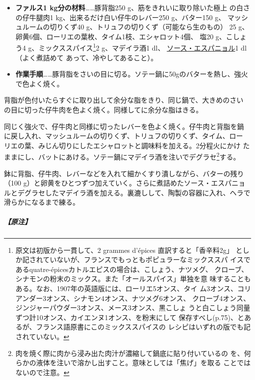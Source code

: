 \begin{recette}
\begin{itemize}
\item
  \textbf{ファルス1 kg分の材料}\ldots{}\ldots{}豚背脂250
  g、筋をきれいに取り除いた極上 の白さの仔牛腿肉1
  kg、出来るだけ白い仔牛のレバー250 g、バター150 g、
  マッシュルームの切りくず40 g、トリュフの切りくず（可能なら生のもの）
  25 g、卵黄6個、ローリエの葉\undemi{}枚、タイム1枝、エシャロット4個、
  塩20 g、こしょう4 g、ミックススパイス\footnote{原文は初版から一貫して、2
    grammes d'épices 直訳すると「香辛料2g」
    としか記されていないが、フランスでもっともポピュラーなミックススパ
    イスであるquatre-épicesカトルエピスの場合は、こしょう、ナツメグ、
    クローブ、シナモンの粉末のミックス。また「オールスパイス」単独を意
    味することもある。なお、1907年の英語版には、ローリエ5オンス、タイ
    ム3オンス、コリアンダー3オンス、シナモン4オンス、ナツメグ6オンス、
    クローブ4オンス、ジンジャーパウダー3オンス、メース3オンス、黒こしょ
    うと白こしょう同量ずつ計10オンス、カイエンヌ1オンス、を粉末にして
    保存すべし(p.75)、とあるが、フランス語原書にこのミックススパイスの
    レシピはいずれの版でも記されていない。}2 g、マデイラ酒1\undemi{}
  dl、
  \protect\hyperlink{sauce-espagnole}{ソース・エスパニョル}1\undemi{}
  dl（よく煮詰めて あって、冷やしてあること）。
\item
  \textbf{作業手順}\ldots{}\ldots{}豚背脂をさいの目に切る。ソテー鍋に50gのバターを熱し、強火で色よく焼く。
\end{itemize}

背脂が色付いたらすぐに取り出して余分な脂をきり、同じ鍋で、大きめのさい
の目に切った仔牛肉を色よく焼く。同様してに余分な脂はきる。

同じく強火で、仔牛肉と同様に切ったレバーを色よく焼く。仔牛肉と背脂を鍋
に戻し入れ、マッシュルームの切りくず、トリュフの切りくず、タイム、ロー
リエの葉、みじん切りにしたエシャロットと調味料を加える。2分程火にかけ
たままにし、バットにあける。ソテー鍋にマデイラ酒を注いでデグラセ\footnote{肉を焼く際に肉から浸み出た肉汁が濃縮して鍋底に貼り付いているの
  を、何らかの液体を注いで溶かし出すこと。意味としては「焦げ」を取る
  ことではないので注意。}する。

鉢に背脂、仔牛肉、レバーなどを入れて細かくすり潰しながら、バターの残り
（100 g）と卵黄をひとつずつ加えていく。さらに煮詰めたソース・エスパニョ
ルとデグラセしたマデイラ酒を加える。裏漉しして、陶製の容器に入れ、ヘラで
滑らかになるまで練る。

\hypertarget{nota-farce-gratin-a}{%
\subparagraph{【原注】}\label{nota-farce-gratin-a}}


\end{recette}

